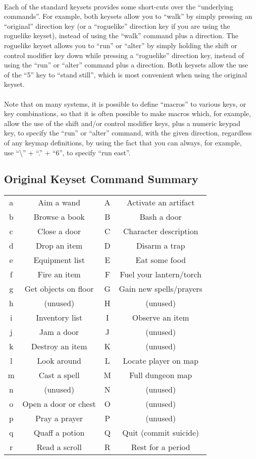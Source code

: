 \paragraph{}Each of the standard keysets provides some short-cuts over the ``underlying
commands''. For example, both keysets allow you to ``walk'' by simply pressing
an ``original'' direction key (or a ``roguelike'' direction key if you are using
the roguelike keyset), instead of using the ``walk'' command plus a direction.
The roguelike keyset allows you to ``run'' or ``alter'' by simply holding the
shift or control modifier key down while pressing a ``roguelike'' direction key,
instead of using the ``run'' or ``alter'' command plus a direction. Both keysets
allow the use of the ``5'' key to ``stand still'', which is most convenient when
using the original keyset.

\paragraph{}Note that on many systems, it is possible to define ``macros'' to various
keys, or key combinations, so that it is often possible to make macros which,
for example, allow the use of the shift and/or control modifier keys, plus a
numeric keypad key, to specify the ``run'' or ``alter'' command, with the given
direction, regardless of any keymap definitions, by using the fact that you
can always, for example, use ``\textbackslash '' + ``.'' + ``6'', to specify ``run
east''.

\subsection{Original Keyset Command Summary}
\begin{tabular}{cc|cc}
a & Aim a wand & A & Activate an artifact\\
b & Browse a book & B & Bash a door\\
c & Close a door & C & Character description\\
d & Drop an item & D & Disarm a trap\\
e & Equipment list & E & Eat some food\\
f & Fire an item & F & Fuel your lantern/torch\\
g & Get objects on floor & G & Gain new spells/prayers\\
h & (unused) & H & (unused)\\
i & Inventory list & I & Observe an item\\
j & Jam a door & J & (unused)\\
k & Destroy an item & K & (unused)\\
l & Look around & L & Locate player on map\\
m & Cast a spell & M & Full dungeon map\\
n & (unused) & N & (unused)\\
o & Open a door or chest & O & (unused)\\
p & Pray a prayer & P & (unused)\\
q & Quaff a potion & Q & Quit (commit suicide)\\
r & Read a scroll & R & Rest for a period\\
\end{tabular}
